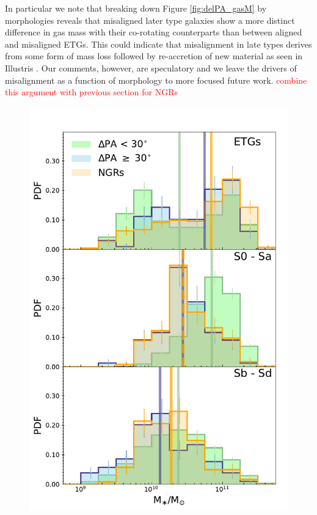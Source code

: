 \documentclass[fleqn,usenatbib]{mnras}
\newcommand{\red}[1]{{\textcolor{red}{#1}}}
\begin{document}
In particular we note that breaking down Figure \ref{fig:delPA_gasM} by morphologies reveals that misaligned later type galaxies show a more distinct difference in gas mass with their co-rotating counterparts than between aligned and misaligned ETGs. This could indicate that misalignment in late types derives from some form of mass loss followed by re-accretion of new material as seen in Illustris \citep{starkenburg+19}. Our comments, however, are speculatory and we leave the drivers of misalignment as a function of morphology to more focused future work. \red{combine this argument with previous section for NGRs}

\begin{figure}
	\includegraphics[width=\linewidth]{morph/delPA_stelM_morph.pdf}

\end{figure}
\end{document}
